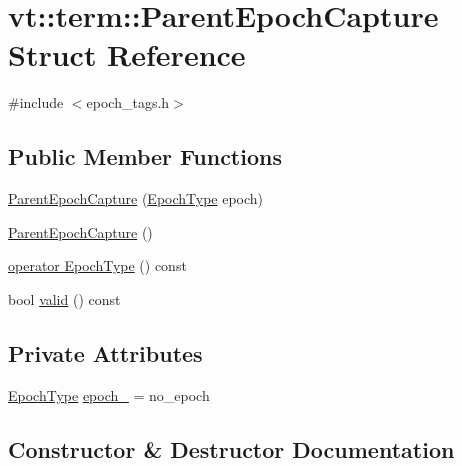 \hypertarget{structvt_1_1term_1_1_parent_epoch_capture}{}\section{vt\+:\+:term\+:\+:Parent\+Epoch\+Capture Struct Reference}
\label{structvt_1_1term_1_1_parent_epoch_capture}


{\ttfamily \#include $<$epoch\+\_\+tags.\+h$>$}

\subsection*{Public Member Functions}
\begin{DoxyCompactItemize}
\item 
\hyperlink{structvt_1_1term_1_1_parent_epoch_capture_aab8cb84fc9f233d2a03f3f550fccd601}{Parent\+Epoch\+Capture} (\hyperlink{namespacevt_a81d11b28122d43bf9834577e4a06440f}{Epoch\+Type} epoch)
\item 
\hyperlink{structvt_1_1term_1_1_parent_epoch_capture_a8a84ae05c8fb68499c6d5e52f2420221}{Parent\+Epoch\+Capture} ()
\item 
\hyperlink{structvt_1_1term_1_1_parent_epoch_capture_a2d719573a4e469b37374b94b5c990d0a}{operator Epoch\+Type} () const
\item 
bool \hyperlink{structvt_1_1term_1_1_parent_epoch_capture_a756a8fa40a0e724ca7ea8b5d7a9a8b45}{valid} () const
\end{DoxyCompactItemize}
\subsection*{Private Attributes}
\begin{DoxyCompactItemize}
\item 
\hyperlink{namespacevt_a81d11b28122d43bf9834577e4a06440f}{Epoch\+Type} \hyperlink{structvt_1_1term_1_1_parent_epoch_capture_a1d8ee50cac9b459aed1ec1295afa03ff}{epoch\+\_\+} = no\+\_\+epoch
\end{DoxyCompactItemize}


\subsection{Constructor \& Destructor Documentation}
\mbox{\label{structvt_1_1term_1_1_parent_epoch_capture_aab8cb84fc9f233d2a03f3f550fccd601}} 
